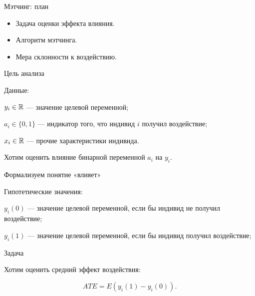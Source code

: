
\begin{frame} %


\end{frame}



\begin{frame}{Мэтчинг: план}
  \begin{itemize}[<+->]
    \item Задача оценки эффекта влияния.
    \item Алгоритм мэтчинга.
    \item Мера склонности к воздействию. 
  \end{itemize}

\end{frame}


\begin{frame}{Цель анализа}

Данные:

$y_i \in \mathbb{R}$ — значение целевой переменной;

$a_i \in \{0, 1\}$ — индикатор того, что индивид $i$ получил воздействие;

$x_i \in \mathbb{R}$ — прочие характеристики индивида.

\pause

Хотим оценить \alert{влияние} бинарной переменной $a_i$ на $y_i$.

\end{frame}

\begin{frame}{Формализуем понятие «влияет»}

\alert{Гипотетические} значения:

$y_i(0)$ — значение целевой переменной, \alert{если бы} индивид не получил воздействие;

$y_i(1)$ — значение целевой переменной, \alert{если бы} индивид получил воздействие;

\pause 


\begin{block}{Задача}

Хотим оценить \alert{средний эффект воздействия}:

\[
ATE  = E(y_i(1) - y_i(0)).
\]
\end{block}


\end{frame}




